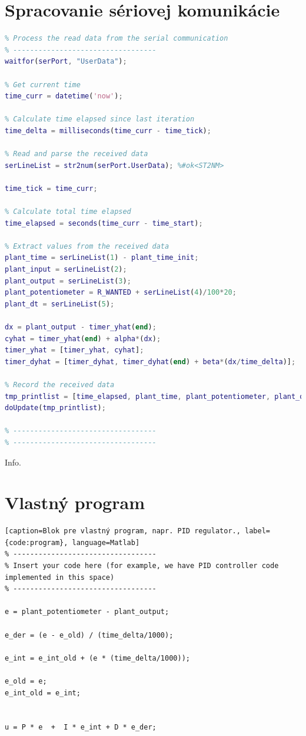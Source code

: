 \documentclass[a4paper, 10pt, ]{article}
\begin{document}
\section{Spracovanie sériovej komunikácie}
\begin{lstlisting}[caption=Spracovanie a zaznamenie dát zo sériovej komunikácie., label={code:record}, language=Matlab]
% ----------------------------------
% Process the read data from the serial communication
% ----------------------------------
waitfor(serPort, "UserData");

% Get current time
time_curr = datetime('now');

% Calculate time elapsed since last iteration
time_delta = milliseconds(time_curr - time_tick);

% Read and parse the received data
serLineList = str2num(serPort.UserData); %#ok<ST2NM>

time_tick = time_curr;

% Calculate total time elapsed
time_elapsed = seconds(time_curr - time_start);

% Extract values from the received data
plant_time = serLineList(1) - plant_time_init;
plant_input = serLineList(2);
plant_output = serLineList(3);
plant_potentiometer = R_WANTED + serLineList(4)/100*20;
plant_dt = serLineList(5);

dx = plant_output - timer_yhat(end);
cyhat = timer_yhat(end) + alpha*(dx);
timer_yhat = [timer_yhat, cyhat];
timer_dyhat = [timer_dyhat, timer_dyhat(end) + beta*(dx/time_delta)];

% Record the received data
tmp_printlist = [time_elapsed, plant_time, plant_potentiometer, plant_output, plant_input, plant_dt, time_delta];
doUpdate(tmp_printlist);

% ----------------------------------
% ----------------------------------
\end{lstlisting}

Info.

\section{Vlastný program}
\begin{lstlisting}[caption=Blok pre vlastný program, napr. PID regulator., label={code:program}, language=Matlab]
% ----------------------------------
% Insert your code here (for example, we have PID controller code implemented in this space)
% ----------------------------------

e = plant_potentiometer - plant_output;

e_der = (e - e_old) / (time_delta/1000);

e_int = e_int_old + (e * (time_delta/1000));

e_old = e;
e_int_old = e_int;


u = P * e  +  I * e_int + D * e_der;
\end{lstlisting}
\end{document}
